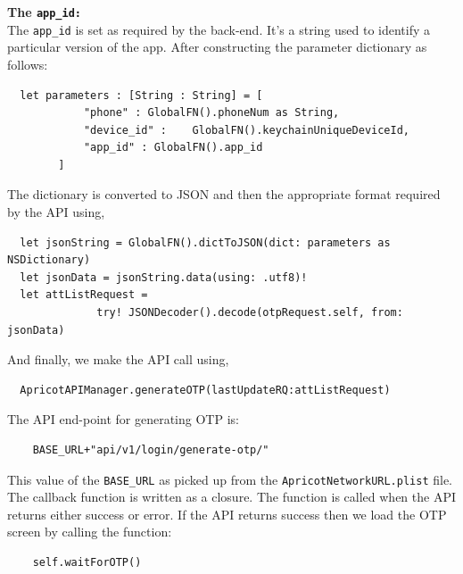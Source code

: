 \documentclass[12pt, conference, a4paper]{article}
\begin{document}
\textbf{The \texttt{app_id:}}\\
The \texttt{app_id} is set as required by the back-end. It’s a string used to identify a particular version of the app. 
After constructing the parameter dictionary as follows:
\begin{verbatim}
  let parameters : [String : String] = [
            "phone" : GlobalFN().phoneNum as String,
            "device_id" :    GlobalFN().keychainUniqueDeviceId,
            "app_id" : GlobalFN().app_id
        ]
\end{verbatim}
The dictionary is converted to JSON and then the appropriate format required by the API using,
\begin{verbatim}
  let jsonString = GlobalFN().dictToJSON(dict: parameters as NSDictionary)
  let jsonData = jsonString.data(using: .utf8)!
  let attListRequest = 
              try! JSONDecoder().decode(otpRequest.self, from: jsonData)
\end{verbatim}
And finally, we make the API call using,
\begin{verbatim}
  ApricotAPIManager.generateOTP(lastUpdateRQ:attListRequest)
\end{verbatim}
The API end-point for generating OTP is:
\begin{verbatim}
	BASE_URL+"api/v1/login/generate-otp/"
\end{verbatim}
This value of the \texttt{BASE_URL} as picked up from the  \texttt{ApricotNetworkURL.plist}  file.
The callback function is written as a closure. The function is called when the API returns either success or error. If the API returns success then we load the OTP screen by calling the function:
\begin{verbatim}
	self.waitForOTP()
\end{verbatim}
\end{document}
